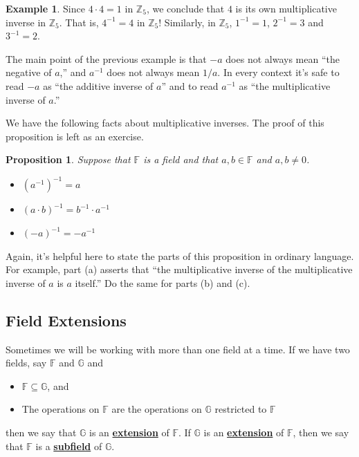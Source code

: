 \documentclass[11pt]{article}
\newenvironment{task}
	{\begin{mdframed}[linecolor=lightgray, linewidth=3pt]\raggedright}
	{\end{mdframed}}
\renewcommand\emph[1]{\underline{\bf{#1}}} %
\newtheorem{proposition}[theorem]{Proposition}
\theoremstyle{definition}
\newtheorem{example}[theorem]{Example}
\begin{document}
\begin{example}
  Since $4\cdot 4 = 1$ in $\mathbb{Z}_5$, we conclude that $4$ is its own multiplicative inverse in $\mathbb{Z}_5$. That is, $4^{-1}=4$ in $\mathbb{Z}_5$!
  Similarly, in $\mathbb{Z}_5$, $1^{-1}=1$, $2^{-1}=3$ and $3^{-1}=2$.

\end{example}

The main point of the previous example is that $-a$ does not always mean ``the negative of $a$,'' and $a^{-1}$ does not always mean $1/a$. In every context
it's safe to read $-a$ as ``the additive inverse of $a$'' and to read $a^{-1}$ as ``the multiplicative inverse of $a$.''

We have the following facts about multiplicative inverses. The proof of this proposition is left as an exercise.

\begin{proposition} Suppose that $\mathbb{F}$ is a field and that $a,b\in\mathbb{F}$ and $a,b\neq 0$.
  \begin{itemize}
    \item[(a)] $(a^{-1})^{-1} = a$
    \item[(b)] $(a\cdot b)^{-1}=b^{-1}\cdot a^{-1}$
    \item[(c)] $(-a)^{-1} = -a^{-1}$
  \end{itemize}\label{prop: multiplicative inverses}
\end{proposition}

\begin{task}
Again, it's helpful here to state the parts of this proposition in ordinary language. For example, part (a) asserts that ``the multiplicative inverse of
the multiplicative inverse of $a$ is $a$ itself.'' Do the same for parts (b) and (c).
\end{task}

\subsection{Field Extensions}

Sometimes we will be working with more than one field at a time. If we have two fields, say $\mathbb{F}$ and $\mathbb{G}$ and
\begin{itemize}
  \item $\mathbb{F}\subseteq \mathbb{G}$, and
  \item The operations on $\mathbb{F}$ are the operations on $\mathbb{G}$ restricted to $\mathbb{F}$
\end{itemize}
then we say that $\mathbb{G}$ is an \emph{extension} of $\mathbb{F}$. If $\mathbb{G}$ is an \emph{extension} of $\mathbb{F}$, then we say that
$\mathbb{F}$ is a \emph{subfield} of $\mathbb{G}$.
\end{document}
